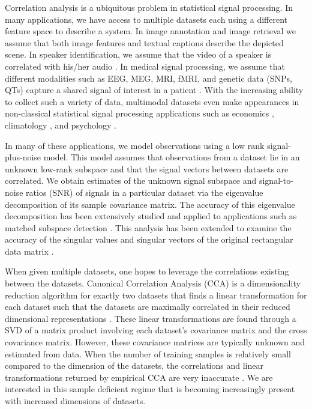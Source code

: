 Correlation analysis is a ubiquitous problem in statistical signal processing. In many
applications, we have access to multiple datasets each using a different feature space to
describe a system. In image annotation \cite{hardoon2006correlation} and image retrieval
\cite{hardoon2004canonical} we assume that both image features and textual captions
describe the depicted scene. In speaker identification, we assume that the video of a
speaker is correlated with his/her audio \cite{chaudhuri2009multi}.  In medical signal
processing, we assume that different modalities such as EEG, MEG, MRI, fMRI, and genetic
data (SNPs, QTs) capture a shared signal of interest in a patient
\cite{deleus2011functional,correa2010canonical,wilms2013sparse,zhang2013l1,
singanamalli2014supervised,yan2014accelerating,spuler2013spatial,
lin2014correspondence,campi2013non}.  With the increasing ability to collect such a
variety of data, multimodal datasets even make appearances in non-classical statistical
signal processing applications such as economics \cite{todros2012measure,doscanonical},
climatology \cite{wilks2014probabilistic,prera2014using}, and psychology
\cite{vilsaint2013ecology,travis2014creativity}.

In many of these applications, we model observations using a low rank signal-plus-noise
model. This model assumes that observations from a dataset lie in an unknown low-rank
subspace and that the signal vectors between datasets are correlated. We obtain estimates
of the unknown signal subspace and signal-to-noise ratios (SNR) of signals in a particular
dataset via the eigenvalue decomposition of its sample covariance matrix. The accuracy of
this eigenvalue decomposition has been extensively studied
\cite{paul2007asymptotics,benaych2011eigenvalues} and applied to applications such as
matched subspace detection \cite{asendorf2013performance}. This analysis has been extended
to examine the accuracy of the singular values and singular vectors of the original
rectangular data matrix \cite{benaych2012singular}.

When given multiple datasets, one hopes to leverage the correlations existing between the
datasets. Canonical Correlation Analysis (CCA) is a dimensionality reduction algorithm for
exactly two datasets that finds a linear transformation for each dataset such that the
datasets are maximally correlated in their reduced dimensional representations
\cite{hotelling1936relations}. These linear transformations are found through a SVD of a
matrix product involving each dataset's covariance matrix and the cross covariance
matrix. However, these covariance matrices are typically unknown and estimated from
data. When the number of training samples is relatively small compared to the dimension of
the datasets, the correlations and linear transformations returned by empirical CCA are
very inaccurate \cite{pezeshki2004empirical, nadakuditi2011fundamental}. We are
interested in this sample deficient regime that is becoming increasingly present with
increased dimensions of datasets.

